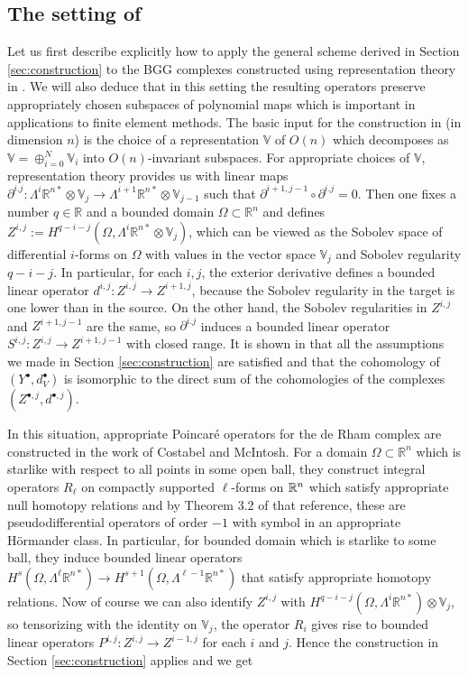 \documentclass[11pt]{amsart}
\newcommand{\0}{\mathaccent23}
\newcommand{\bs}{{\scriptscriptstyle \bullet}}
\begin{document}
\subsection{The setting of \cite{vcap2022bgg}}\label{sec:repr-bgg}
Let us first describe explicitly how to apply the general scheme derived in Section \ref{sec:construction} to the BGG complexes constructed {using representation theory} in \cite{vcap2022bgg}. We will also deduce that in this setting the resulting operators preserve appropriately chosen subspaces of polynomial maps which is important in applications to finite element methods. The basic input for the construction in  \cite{vcap2022bgg} (in dimension $n$) is the choice of a representation $\mathbb V$ of $O(n)$ which decomposes as $\mathbb V=\oplus_{i=0}^N\mathbb V_i$ into $O(n)$-invariant subspaces. {For appropriate choices of $\mathbb V$,} representation theory provides us with linear maps $\partial^{i.j}:\Lambda^i\mathbb R^{n*}\otimes\mathbb V_j\to\Lambda^{i+1}\mathbb R^{n*}\otimes\mathbb V_{j-1}$ such that $\partial^{i+1,j-1}\circ\partial^{i.j}=0$. Then one fixes a number $q\in\mathbb R$ and a bounded domain $\Omega\subset\mathbb R^n$ and defines $Z^{i,j}:=H^{q-i-j}(\Omega,\Lambda^i\mathbb R^{n*}\otimes\mathbb V_j)$, which can be viewed as the Sobolev space of differential $i$-forms on $\Omega$ with values in the vector space $\mathbb V_j$ and Sobolev regularity $q-i-j$. In particular, for each $i,j$, the exterior derivative defines a bounded linear operator $d^{i,j}:Z^{i,j}\to Z^{i+1,j}$, because the Sobolev regularity in the target is one lower than in the source. On the other hand, the Sobolev regularities in $Z^{i,j}$ and $Z^{i+1,j-1}$ are the same, so $\partial^{i.j}$ induces a bounded linear operator $S^{i,j}:Z^{i,j}\to Z^{i+1,j-1}$ with closed range. It is shown in \cite{vcap2022bgg} that all the assumptions we made in Section \ref{sec:construction} are satisfied and that the cohomology of $(Y^\bs,d^\bs_V)$ is isomorphic to the direct sum of the cohomologies of the complexes $(Z^{\bs,j},d^{\bs,j})$.

In this situation, appropriate Poincar\'e operators for the de Rham complex are constructed in the work \cite{costabel2010bogovskiui} of Costabel and McIntosh. For a domain $\Omega\subset\mathbb R^n$ which is starlike with respect to all points in some open ball, they construct integral operators $R_\ell$ on compactly supported $\ell$-forms on $\Bbb R^n$ which satisfy appropriate null homotopy relations and by Theorem 3.2 of that reference, these are pseudodifferential operators of order $-1$ with symbol in an appropriate H\"ormander class. In particular, for bounded domain which is starlike to some ball, they induce bounded linear operators $H^s(\Omega,\Lambda^\ell\mathbb R^{n*})\to H^{s+1}(\Omega,\Lambda^{\ell-1}\mathbb R^{n*})$ that satisfy appropriate homotopy relations. Now of course we can also identify $Z^{i,j}$ with $H^{q-i-j}(\Omega,\Lambda^i\mathbb R^{n*})\otimes\mathbb V_j$, so tensorizing with the identity on $\mathbb V_j$, the operator $R_i$ gives rise to bounded linear operators $P^{i,j}:Z^{i,j}\to Z^{i-1,j}$ for each $i$ and $j$. Hence the construction in Section \ref{sec:construction} applies and we get
\end{document}
